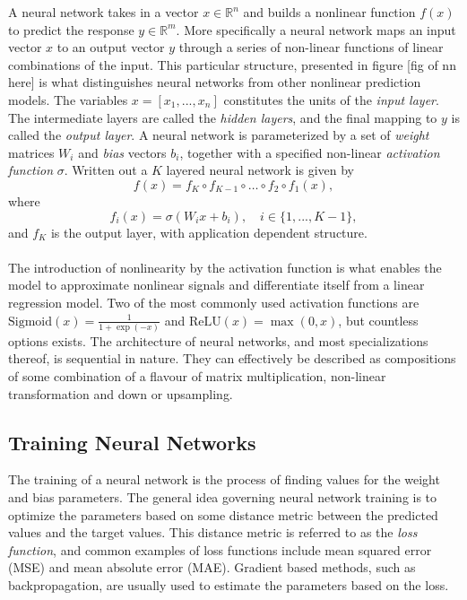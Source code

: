 \documentclass[../../thesis.tex]{subfiles}
\begin{document}
A neural network takes in a vector $x \in \mathbb{R}^n$ and builds a nonlinear function $f(x)$ to predict the response $y\in \mathbb{R}^m$. More specifically a neural network maps an input vector $x$ to an output vector $y$ through a series of non-linear functions of linear combinations of the input. This particular structure, presented in figure [fig of nn here] is what distinguishes neural networks from other nonlinear prediction models. The variables $x = [x_1,...,x_n]$ constitutes the units of the \textit{input layer}. The intermediate layers are called the \textit{hidden layers}, and the final mapping to $y$ is called the \textit{output layer}. A neural network is parameterized by a set of \textit{weight} matrices $W_i$ and \textit{bias} vectors $b_i$, together with a specified non-linear \textit{activation function} $\sigma$. Written out a $K$ layered neural network is given by 
\[ 
f(x) = f_K \circ f_{K-1} \circ \ldots \circ f_2 \circ f_1(x),
\]
where 
$$f_i(x) = \sigma(W_ix+b_i), \quad i \in \{1,...,K-1\},$$ 
and $f_K$ is the output layer, with application dependent structure.\\\\ 

The introduction of nonlinearity by the activation function is what enables the model to approximate nonlinear signals and differentiate itself from a linear regression model. Two of the most commonly used activation functions are $\text{Sigmoid}(x) = \tfrac{1}{1+\exp(-x)}$ and $\text{ReLU}(x) = \max(0,x)$, but countless options exists.\newline
The architecture of neural networks, and most specializations thereof, is sequential in nature. They can effectively be described as compositions of some combination of a flavour of matrix multiplication, non-linear transformation and down or upsampling. 

\subsection{Training Neural Networks}

The training of a neural network is the process of finding values for the weight and bias parameters. The general idea governing neural network training is to optimize the parameters based on some distance metric between the predicted values and the target values. This distance metric is referred to as the \textit{loss function}, and common examples of loss functions include mean squared error (MSE) and mean absolute error (MAE). Gradient based methods, such as backpropagation, are usually used to estimate the parameters based on the loss.\newline
\end{document}
